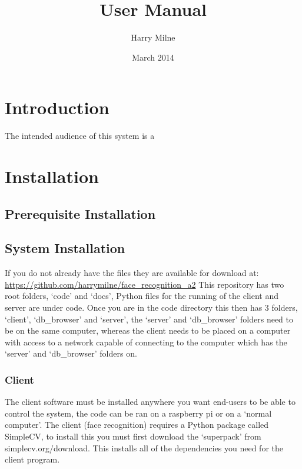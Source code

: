 \documentclass[a4paper]{article}
\title{User Manual}
\author{Harry Milne}
\date{March 2014}
\begin{document}
\maketitle
\tableofcontents

\section{Introduction}

The intended audience of this system is a 
\section{Installation}
\subsection{Prerequisite Installation}

\subsection{System Installation}
If you do not already have the files they are available for download at: \url{https://github.com/harrymilne/face_recognition_a2}
This repository has two root folders, `code' and `docs', Python files for the running of the client and server are under code.
Once you are in the code directory this then has 3 folders, `client', `db\_browser' and `server', the `server' and `db\_browser'
folders need to be on the same computer, whereas the client needs to be placed on a computer with access to a network capable of
connecting to the computer which has the `server' and `db\_browser' folders on. 

\subsubsection{Client}
The client software must be installed anywhere you want end-users to be able to control the system, the code can be ran on a 
raspberry pi or on a `normal computer'. 
The client (face recognition) requires a Python package called SimpleCV, to install this you must first 
download the `superpack' from simplecv.org/download. This installs all of the dependencies you need for the client program.
\end{document}
